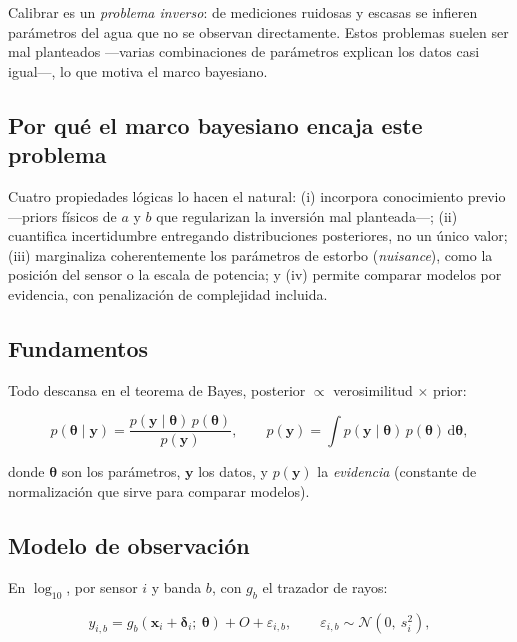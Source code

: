 \documentclass[11pt,a4paper]{article}
\begin{document}
Calibrar es un \emph{problema inverso}: de mediciones ruidosas y escasas se infieren
parámetros del agua que no se observan directamente. Estos problemas suelen ser mal
planteados —varias combinaciones de parámetros explican los datos casi igual—, lo
que motiva el marco bayesiano.

\subsection{Por qué el marco bayesiano encaja este problema}

Cuatro propiedades lógicas lo hacen el natural: (i) incorpora conocimiento previo
—priors físicos de $a$ y $b$ que regularizan la inversión mal planteada—; (ii)
cuantifica incertidumbre entregando distribuciones posteriores, no un único valor;
(iii) marginaliza coherentemente los parámetros de estorbo (\emph{nuisance}), como
la posición del sensor o la escala de potencia; y (iv) permite comparar modelos por
evidencia, con penalización de complejidad incluida.

\subsection{Fundamentos}

Todo descansa en el teorema de Bayes, posterior $\propto$ verosimilitud $\times$
prior:

\begin{equation}
p(\boldsymbol\theta\mid\mathbf{y}) = \frac{p(\mathbf{y}\mid\boldsymbol\theta)\,p(\boldsymbol\theta)}{p(\mathbf{y})},
\qquad
p(\mathbf{y}) = \int p(\mathbf{y}\mid\boldsymbol\theta)\,p(\boldsymbol\theta)\,\mathrm{d}\boldsymbol\theta,
\label{eq:bayes}
\end{equation}

donde $\boldsymbol\theta$ son los parámetros, $\mathbf{y}$ los datos, y
$p(\mathbf{y})$ la \emph{evidencia} (constante de normalización que sirve para
comparar modelos).

\subsection{Modelo de observación}

En $\log_{10}$, por sensor $i$ y banda $b$, con $g_b$ el trazador de rayos:

\begin{equation}
y_{i,b} = g_b(\mathbf{x}_i + \boldsymbol\delta_i;\ \boldsymbol\theta) + O + \varepsilon_{i,b},
\qquad \varepsilon_{i,b}\sim\mathcal{N}(0,\ s_i^2),
\label{eq:obsmodel}
\end{equation}
\end{document}
